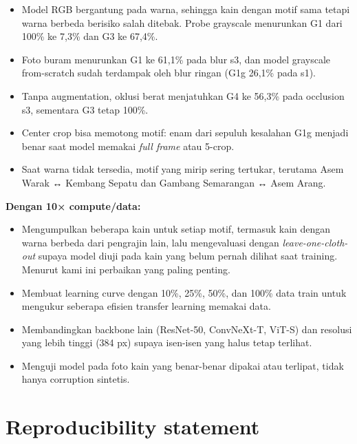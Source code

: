 \documentclass[10pt,a4paper]{article}
\providecommand{\tightlist}{\setlength{\itemsep}{2pt}\setlength{\parskip}{0pt}}
\begin{document}
\begin{itemize}
\tightlist
\item
  Model RGB bergantung pada warna, sehingga kain dengan motif sama tetapi warna berbeda berisiko salah ditebak. Probe grayscale menurunkan G1 dari 100\% ke 7,3\% dan G3 ke 67,4\%.
\item
  Foto buram menurunkan G1 ke 61,1\% pada blur s3, dan model grayscale from-scratch sudah terdampak oleh blur ringan (G1g 26,1\% pada s1).
\item
  Tanpa augmentation, oklusi berat menjatuhkan G4 ke 56,3\% pada occlusion s3, sementara G3 tetap 100\%.
\item
  Center crop bisa memotong motif: enam dari sepuluh kesalahan G1g menjadi benar saat model memakai \emph{full frame} atau 5-crop.
\item
  Saat warna tidak tersedia, motif yang mirip sering tertukar, terutama Asem Warak ↔ Kembang Sepatu dan Gambang Semarangan ↔ Asem Arang.
\end{itemize}

\textbf{Dengan 10× compute/data:}

\begin{itemize}
\tightlist
\item
  Mengumpulkan beberapa kain untuk setiap motif, termasuk kain dengan warna berbeda dari pengrajin lain, lalu mengevaluasi dengan \emph{leave-one-cloth-out} supaya model diuji pada kain yang belum pernah dilihat saat training. Menurut kami ini perbaikan yang paling penting.
\item
  Membuat learning curve dengan 10\%, 25\%, 50\%, dan 100\% data train untuk mengukur seberapa efisien transfer learning memakai data.
\item
  Membandingkan backbone lain (ResNet-50, ConvNeXt-T, ViT-S) dan resolusi yang lebih tinggi (384 px) supaya isen-isen yang halus tetap terlihat.
\item
  Menguji model pada foto kain yang benar-benar dipakai atau terlipat, tidak hanya corruption sintetis.
\end{itemize}

\section{Reproducibility statement}\label{reproducibility-statement}
\end{document}
